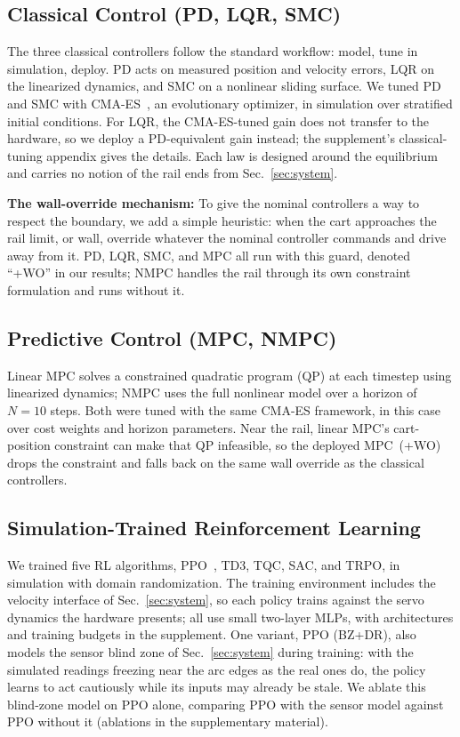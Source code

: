 \subsection{Classical Control (PD, LQR, SMC)}

The three classical controllers follow the standard workflow: model, tune in simulation, deploy.
PD acts on measured position and velocity errors, LQR on the linearized dynamics, and SMC on a nonlinear sliding surface.
We tuned PD and SMC with CMA-ES~\cite{hansen2016cma}, an evolutionary optimizer, in simulation over stratified initial conditions.
For LQR, the CMA-ES-tuned gain does not transfer to the hardware, so we deploy a PD-equivalent gain instead; the supplement's classical-tuning appendix gives the details.
Each law is designed around the equilibrium and carries no notion of the rail ends from Sec.~\ref{sec:system}.

\noindent\textbf{The wall-override mechanism:} To give the nominal controllers a way to respect the boundary, we add a simple heuristic: when the cart approaches the rail limit, or wall, override whatever the nominal controller commands and drive away from it.
PD, LQR, SMC, and MPC all run with this guard, denoted ``+WO'' in our results; NMPC handles the rail through its own constraint formulation and runs without it.

\subsection{Predictive Control (MPC, NMPC)}

Linear MPC solves a constrained quadratic program (QP) at each timestep using linearized dynamics; NMPC uses the full nonlinear model over a horizon of $N=10$ steps.
Both were tuned with the same CMA-ES framework, in this case over cost weights and horizon parameters.
Near the rail, linear MPC's cart-position constraint can make that QP infeasible, so the deployed MPC~(+WO) drops the constraint and falls back on the same wall override as the classical controllers.

\subsection{Simulation-Trained Reinforcement Learning}

We trained five RL algorithms, PPO~\cite{schulman2017proximal}, TD3, TQC, SAC, and TRPO, in simulation with domain randomization.
The training environment includes the velocity interface of Sec.~\ref{sec:system}, so each policy trains against the servo dynamics the hardware presents; all use small two-layer MLPs, with architectures and training budgets in the supplement.
One variant, PPO (BZ+DR), also models the sensor blind zone of Sec.~\ref{sec:system} during training: with the simulated readings freezing near the arc edges as the real ones do, the policy learns to act cautiously while its inputs may already be stale.
We ablate this blind-zone model on PPO alone, comparing PPO with the sensor model against PPO without it (ablations in the supplementary material).


